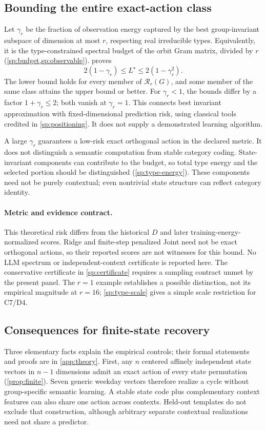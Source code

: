 \documentclass{article}
\begin{document}
\subsection{Bounding the entire exact-action class}
Let $\gamma_r$ be the fraction of observation energy captured by the best group-invariant subspace of dimension at most $r$, respecting real irreducible types. Equivalently, it is the type-constrained spectral budget of the orbit Gram matrix, divided by $r$ (\cref{sp:budget,sp:observable}).  proves
\[
 \boxed{\ 2(1-\gamma_r)\le L^\star\le2(1-\gamma_r^2).\ }
\]
The lower bound holds for every member of $\mathcal R_r(G)$, and some member of the same class attains the upper bound or better. For $\gamma_r<1$, the bounds differ by a factor $1+\gamma_r\le2$; both vanish at $\gamma_r=1$. This connects best invariant approximation with fixed-dimensional prediction risk, using classical tools credited in \cref{sp:positioning}. It does not supply a demonstrated learning algorithm.

A large $\gamma_r$ guarantees a low-risk exact orthogonal action in the declared metric. It does not distinguish a semantic computation from stable category coding. State-invariant components can contribute to the budget, so total type energy and the selected portion should be distinguished (\cref{sp:type-energy}). These components need not be purely contextual; even nontrivial state structure can reflect category identity.

\paragraph{Metric and evidence contract.}
This theoretical risk differs from the historical $D$ and later training-energy-normalized scores. Ridge and finite-step penalized Joint need not be exact orthogonal actions, so their reported scores are not witnesses for this bound. No LLM spectrum or independent-context certificate is reported here. The conservative certificate in \cref{sp:certificate} requires a sampling contract unmet by the present panel. The $r=1$ example establishes a possible distinction, not its empirical magnitude at $r=16$; \cref{sp:type-scale} gives a simple scale restriction for C7/D4.

\subsection{Consequences for finite-state recovery}
Three elementary facts explain the empirical controls; their formal statements and proofs are in \cref{app:theory}. First, any $n$ centered affinely independent state vectors in $n-1$ dimensions admit an exact action of every state permutation (\cref{prop:finite}). Seven generic weekday vectors therefore realize a cycle without group-specific semantic learning. A stable state code plus complementary context features can also share one action across contexts. Held-out templates do not exclude that construction, although arbitrary separate contextual realizations need not share a predictor.
\end{document}
